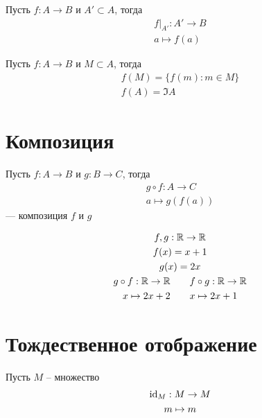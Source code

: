 \documentclass[main]{subfiles}
\begin{document}
\begin{definition}
    Пусть $f: A \to B$ и $A' \subset A$, тогда
    \begin{gather*}
        f|_{A'} :  A' \to B    \\
        a \mapsto f(a)
    \end{gather*}
\end{definition}

\begin{definition}
    Пусть $f: A \to B$ и $M \subset A$, тогда
    \begin{gather*}
        f (M) = \{ f(m): m \in M\}\\
        f (A) = \Im A
    \end{gather*}
\end{definition}

\section{Композиция}
\begin{definition}
    Пусть $f: A \to B$ и  $g: B \to C$, тогда
    \begin{gather*}
        g \circ  f:A \to C\\
        a \mapsto g(f(a))
    \end{gather*} --- композиция $f$ и $g$
\end{definition}
\begin{example}
    \begin{gather*}
        f, g: \mathbb{R} \to \mathbb{R}\\
        f(x) = x+1\\
        g(x) = 2x\\
        g \circ f :\mathbb{R}  \to \mathbb{R} \qquad f \circ g: \mathbb{R} \to \mathbb{R}        \\
        x \mapsto 2x+2 \qquad x \mapsto 2x +1
    \end{gather*}
\end{example}

\section{Тождественное отображение}
\begin{definition}
    Пусть $M$ -- множество
    \begin{gather*}
        \mathrm{id}_M : M \to M \\
        m \mapsto m
    \end{gather*}
\end{definition}
\end{document}
